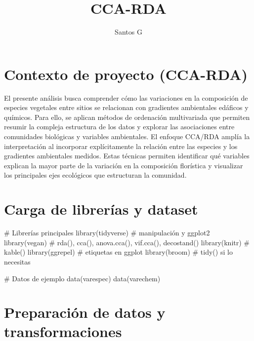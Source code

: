 \documentclass[
  spanish,
  11pt,
  a4paper,
  DIV=11,
  numbers=noendperiod]{scrartcl}
\title{CCA-RDA}
\author{Santos G}
\date{}
\newenvironment{Shaded}{\begin{snugshade}}{\end{snugshade}}
\newcommand{\CommentTok}[1]{\textcolor[rgb]{0.37,0.37,0.37}{#1}}
\newcommand{\FunctionTok}[1]{\textcolor[rgb]{0.28,0.35,0.67}{#1}}
\newcommand{\NormalTok}[1]{\textcolor[rgb]{0.00,0.23,0.31}{#1}}
\renewcommand*\contentsname{Tabla de contenidos}
\newcommand\contentsname{Tabla de contenidos}
\begin{document}
\maketitle

\renewcommand*\contentsname{Tabla de contenidos}
{
\hypersetup{linkcolor=}
\setcounter{tocdepth}{2}
\tableofcontents
}

\section{Contexto de proyecto
(CCA-RDA)}\label{contexto-de-proyecto-cca-rda}

El presente análisis busca comprender cómo las variaciones en la
composición de especies vegetales entre sitios se relacionan con
gradientes ambientales edáficos y químicos. Para ello, se aplican
métodos de ordenación multivariada que permiten resumir la compleja
estructura de los datos y explorar las asociaciones entre comunidades
biológicas y variables ambientales. El enfoque CCA/RDA amplía la
interpretación al incorporar explícitamente la relación entre las
especies y los gradientes ambientales medidos. Estas técnicas permiten
identificar qué variables explican la mayor parte de la variación en la
composición florística y visualizar los principales ejes ecológicos que
estructuran la comunidad.

\section{Carga de librerías y
dataset}\label{carga-de-libreruxedas-y-dataset}

\begin{Shaded}
\begin{Highlighting}[numbers=left,,]
\CommentTok{\# Librerías principales}
\FunctionTok{library}\NormalTok{(tidyverse)   }\CommentTok{\# manipulación y ggplot2}
\FunctionTok{library}\NormalTok{(vegan)       }\CommentTok{\# rda(), cca(), anova.cca(), vif.cca(), decostand()}
\FunctionTok{library}\NormalTok{(knitr)       }\CommentTok{\# kable()}
\FunctionTok{library}\NormalTok{(ggrepel)     }\CommentTok{\# etiquetas en ggplot}
\FunctionTok{library}\NormalTok{(broom)       }\CommentTok{\# tidy() si lo necesitas}

\CommentTok{\# Datos de ejemplo}
\FunctionTok{data}\NormalTok{(varespec)}
\FunctionTok{data}\NormalTok{(varechem)}
\end{Highlighting}
\end{Shaded}

\section{Preparación de datos y
transformaciones}\label{preparaciuxf3n-de-datos-y-transformaciones}
\end{document}
